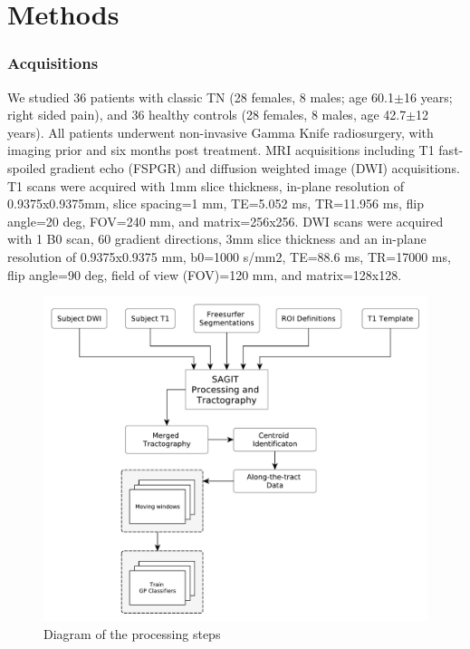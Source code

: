 \section{Methods}


\subsubsection{Acquisitions}
We studied 36 patients with classic TN (28 females, 8 males; age 60.1$\pm$16 years; right sided pain), and 36 healthy controls (28 females, 8 males, age 42.7$\pm$12 years).  All patients underwent non-invasive Gamma Knife radiosurgery, with imaging prior and six months post treatment. MRI acquisitions including T1 fast-spoiled gradient echo (FSPGR) and diffusion weighted image (DWI) acquisitions. T1 scans were acquired with 1mm slice thickness, in-plane resolution of 0.9375x0.9375mm, slice spacing=1 mm, TE=5.052 ms, TR=11.956 ms, flip angle=20 deg, FOV=240 mm, and matrix=256x256. DWI scans were acquired with 1 B0 scan, 60 gradient directions, 3mm slice thickness and an in-plane resolution of 0.9375x0.9375 mm, b0=1000 s/mm2, TE=88.6 ms, TR=17000 ms, flip angle=90 deg, field of view (FOV)=120 mm, and matrix=128x128.

\begin{figure}[ht]
\centering
\includegraphics[width=\linewidth]{thesis/images/tn-gp-sagit/figure-method.pdf}
\caption{Diagram of the processing steps}
\label{fig:GPMethods}
\end{figure}

